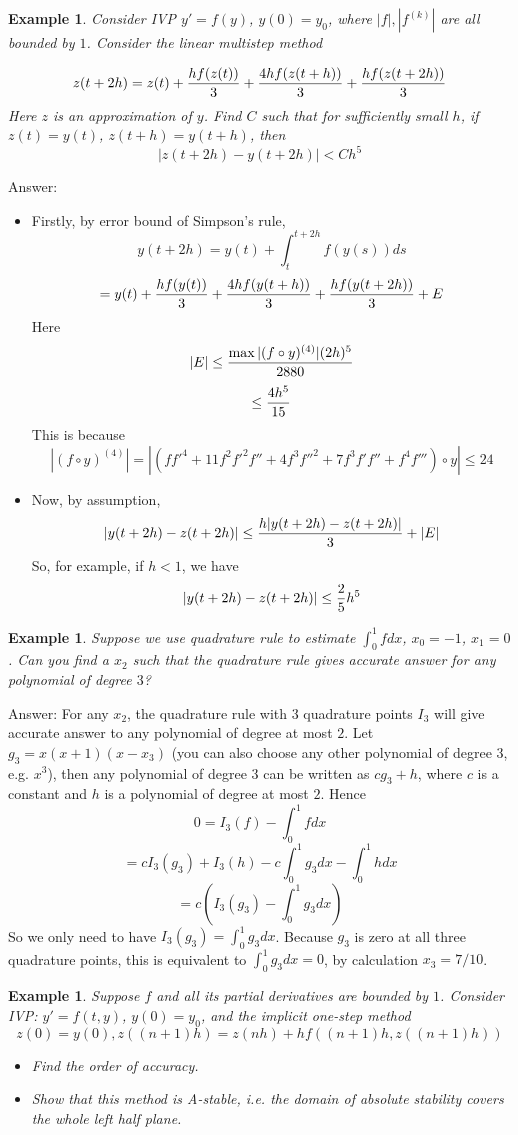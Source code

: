 \documentclass{article} %
\theoremstyle{break}
\newtheorem{exa}[definition]{Example}
\begin{document}
\begin{exa}Consider IVP $y'=f(y)$, $y(0)=y_0$, where $|f|, |f^{(k)}|$ are all bounded by $1$. Consider the linear multistep method

  \[z(t+2h)=z(t)+{hf(z(t))\over 3}+{4hf(z(t+h))\over 3}+{hf(z(t+2h))\over 3}\]
    Here $z$ is an approximation of $y$. Find $C$ such that for sufficiently small $h$, if $z(t)=y(t)$, $z(t+h)=y(t+h)$, then
    \[|z(t+2h)-y(t+2h)|<Ch^5\]
  \end{exa}

  Answer:
  \begin{itemize}
  \item Firstly, by error bound of Simpson's rule,
    \[y(t+2h)=y(t)+\int_t^{t+2h}f(y(s))ds\]
    \[=y(t)+{hf(y(t))\over 3}+{4hf(y(t+h))\over 3}+{hf(y(t+2h))\over 3}+E\]
    Here
    \[|E|\leq{\max|(f\circ y)^{(4)}|(2h)^5\over 2880}\]
    \[\leq {4h^5\over 15}\]
    This is because
    \[|(f\circ y)^{(4)}|=|(ff'^4+11f^2f'^2f''+4f^3f''^2+7f^3f'f''+f^4f''')\circ y|\leq 24\]
  \item Now, by assumption,
    \[|y(t+2h)-z(t+2h)|\leq {h|y(t+2h)-z(t+2h)|\over 3}+|E|\]
    So, for example, if $h<1$, we have
    \[|y(t+2h)-z(t+2h)|\leq {2\over 5}h^5\]
  \end{itemize}
  

\begin{exa}Suppose we use quadrature rule to estimate $\int_0^1fdx$, $x_0=-1$, $x_1=0$. Can you find a $x_2$ such that the quadrature rule gives accurate answer for any polynomial of degree $3$?\end{exa}

Answer: For any $x_2$, the quadrature rule with 3 quadrature points $I_3$ will give accurate answer to any polynomial of degree at most $2$. Let $g_3=x(x+1)(x-x_3)$ (you can also choose any other polynomial of degree 3, e.g. $x^3$), then any polynomial of degree $3$ can be written as $cg_3+h$, where $c$ is a constant and $h$ is a polynomial of degree at most $2$. Hence
\[0=I_3(f)-\int_0^1fdx\]
\[=cI_3(g_3)+I_3(h)-c\int_0^1g_3dx-\int_0^1hdx\]
\[=c(I_3(g_3)-\int_0^1g_3dx)\]
So we only need to have $I_3(g_3)=\int_0^1g_3dx$. Because $g_3$ is zero at all three quadrature points, this is equivalent to $\int_0^1g_3dx=0$, by calculation $x_3=7/10$.



\begin{exa}Suppose $f$ and all its partial derivatives are bounded by $1$. Consider IVP: $y'=f(t, y)$, $y(0)=y_0$, and the implicit one-step method
  \[z(0)=y(0), z((n+1)h)=z(nh)+hf((n+1)h, z((n+1)h))\]
  \begin{itemize}
   \item Find the order of accuracy.
   \item Show that this method is A-stable, i.e. the domain of absolute stability covers the whole left half plane.
  \end{itemize}
\end{exa}
\end{document}
